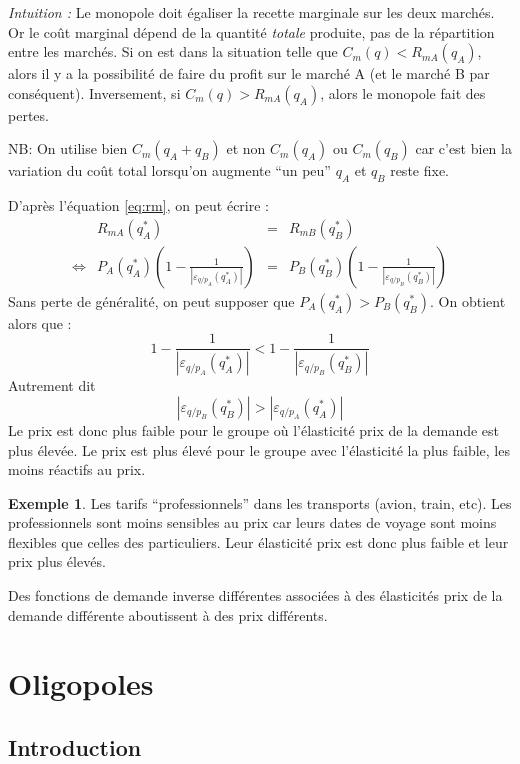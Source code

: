 \documentclass[
]{book}
\theoremstyle{definition}
\theoremstyle{definition}
\newtheorem{example}{Exemple}[chapter]
\theoremstyle{definition}
\theoremstyle{definition}
\theoremstyle{remark}
\begin{document}
\emph{Intuition :}
Le monopole doit égaliser la recette marginale sur les deux marchés.
Or le coût marginal dépend de la quantité \emph{totale} produite, pas de la répartition entre les marchés.
Si on est dans la situation telle que \(C_m(q)<R_{mA}(q_A)\), alors il y a la possibilité de faire du profit sur le marché A (et le marché B par conséquent).
Inversement, si \(C_m(q)>R_{mA}(q_A)\), alors le monopole fait des pertes.

NB: On utilise bien \(C_m(q_A+q_B)\) et non \(C_m(q_A)\) ou \(C_m(q_B)\) car c'est bien la variation du coût total lorsqu'on augmente ``un peu'' \(q_A\) et \(q_B\) reste fixe.

D'après l'équation \eqref{eq:rm}, on peut écrire :
\[
\begin{array}{crcl}
&R_{mA}(q_A^*) &=& R_{mB}(q_B^*)\\
\Leftrightarrow & P_A(q_A^*)\left(1-\frac{1}{\left|\varepsilon_{q/p_A}(q^*_A)\right|}\right) & = & P_B(q_B^*)\left(1-\frac{1}{\left|\varepsilon_{q/p_B}(q_B^*)\right|}\right)
\end{array}
\]
Sans perte de généralité, on peut supposer que \(P_A(q_A^*)> P_B(q_B^*)\).
On obtient alors que :
\[
1-\frac{1}{\left|\varepsilon_{q/p_A}(q_A^*)\right|} <1-\frac{1}{\left|\varepsilon_{q/p_B}(q_B^*)\right|}
\]
Autrement dit
\[
\left|\varepsilon_{q/p_B}(q_B^*)\right|>\left|\varepsilon_{q/p_A}(q^*_A)\right|
\]
Le prix est donc plus faible pour le groupe où l'élasticité prix de la demande est plus élevée.
Le prix est plus élevé pour le groupe avec l'élasticité la plus faible, les moins réactifs au prix.

\begin{example}
Les tarifs ``professionnels'' dans les transports (avion, train, etc).
Les professionnels sont moins sensibles au prix car leurs dates de voyage sont moins flexibles que celles des particuliers.
Leur élasticité prix est donc plus faible et leur prix plus élevés.
\end{example}

Des fonctions de demande inverse différentes associées à des élasticités prix de la demande différente aboutissent à des prix différents.

\hypertarget{oligopoles}{%
\chapter{Oligopoles}\label{oligopoles}}

\hypertarget{introduction}{%
\section{Introduction}\label{introduction}}
\end{document}
